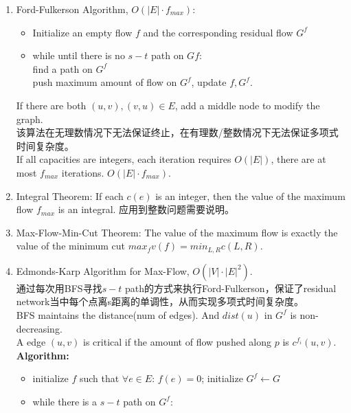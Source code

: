\documentclass[10pt, a4paper, twocolumn]{article}
\begin{document}
\begin{enumerate}[leftmargin = 12pt, topsep = 0pt, itemsep=0pt, partopsep = 0pt]
    \item Ford-Fulkerson Algorithm, $O(|E|\cdot f_{max})$:
        \begin{itemize}[leftmargin = 12pt, topsep = 0pt, itemsep=0pt, partopsep = 0pt]
        \item Initialize an empty flow $f$ and the corresponding residual flow $G^f$
        \item while until there is no $s-t$ path on $Gf$:\\
            find a path on $G^f$\\
            push maximum amount of flow on $G^f$, update $f,G^f$.
        \end{itemize}
        If there are both $(u,v),(v,u)\in E$, add a middle node to modify the graph.\\
        该算法在无理数情况下无法保证终止，在有理数/整数情况下无法保证多项式时间复杂度。\\
        If all capacities are integers, each iteration requires $O(|E|)$, there are at most $f_{max}$ iterations. $O(|E|\cdot f_{max})$.\\
    \item Integral Theorem: If each $c(e)$ is an integer, then the       value of the maximum flow $f_{max}$ is an integral.              应用到整数问题需要说明。
    \item Max-Flow-Min-Cut Theorem: The value of the maximum flow is     exactly the value of the minimum cut $max_f v(f) =               min_{L,R}c(L,R)$.\\
    \item Edmonds-Karp Algorithm for Max-Flow, $O(|V|\cdot |E|^2)$.\\
        通过每次用BFS寻找$s-t$ path的方式来执行Ford-Fulkerson，保证了residual network当中每个点离s距离的单调性，从而实现多项式时间复杂度。\\
        BFS maintains the distance(num of edges). And $dist(u)$ in $G^f$ is non-decreasing.\\
        A edge $(u,v)$ is critical if the amount of flow pushed along $p$ is $c^{f_i}(u,v)$.\\
        \textbf{Algorithm:}
        \begin{itemize}[leftmargin = 12pt, topsep = 0pt, itemsep=0pt, partopsep = 0pt]
        \item initialize $f$ such that $\forall e\in E$: $f(e)=0$; initialize $G^f\leftarrow G$
        \item while there is a $s-t$ path on $G^f$:\\

\end{itemize}
\end{enumerate}
\end{document}

